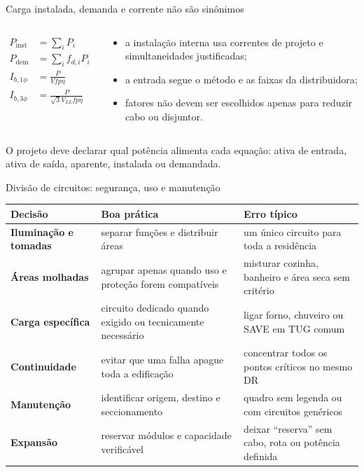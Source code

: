 \begin{frame}{Carga instalada, demanda e corrente não são sinônimos}
\small
\begin{columns}[T,onlytextwidth]
\begin{align*}
P_{\mathrm{inst}}&=\sum_i P_i\\
P_{\mathrm{dem}}&=\sum_i f_{d,i}P_i\\
I_{b,1\phi}&=\frac{P}{Vfp\eta}\\
I_{b,3\phi}&=\frac{P}{\sqrt3V_{LL}fp\eta}
\end{align*}
\begin{caixaNorma}[title=Dois usos distintos]
\begin{itemize}
\item a instalação interna usa correntes de projeto e simultaneidades justificadas;
\item a entrada segue o método e as faixas da distribuidora;
\item fatores não devem ser escolhidos apenas para reduzir cabo ou disjuntor.
\end{itemize}
\end{caixaNorma}
\end{columns}
\begin{caixaObs}
O projeto deve declarar qual potência alimenta cada equação: ativa de entrada, ativa de saída, aparente, instalada ou demandada.
\end{caixaObs}
\end{frame}

\begin{frame}{Divisão de circuitos: segurança, uso e manutenção}
\small
\begin{tabularx}{\textwidth}{>{\bfseries}p{3.0cm}X X}
\toprule
Decisão & Boa prática & Erro típico \\
\midrule
Iluminação e tomadas & separar funções e distribuir áreas & um único circuito para toda a residência \\
Áreas molhadas & agrupar apenas quando uso e proteção forem compatíveis & misturar cozinha, banheiro e área seca sem critério \\
Carga específica & circuito dedicado quando exigido ou tecnicamente necessário & ligar forno, chuveiro ou SAVE em TUG comum \\
Continuidade & evitar que uma falha apague toda a edificação & concentrar todos os pontos críticos no mesmo DR \\
Manutenção & identificar origem, destino e seccionamento & quadro sem legenda ou com circuitos genéricos \\
Expansão & reservar módulos e capacidade verificável & deixar ``reserva'' sem cabo, rota ou potência definida \\
\bottomrule
\end{tabularx}
\end{frame}

